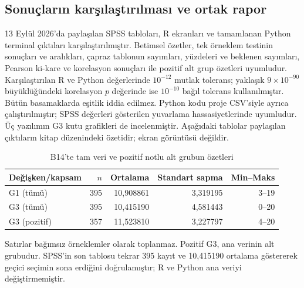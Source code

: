 \subsection{Sonuçların karşılaştırılması ve ortak rapor}
13 Eylül 2026'da paylaşılan SPSS tabloları, R ekranları ve tamamlanan
Python terminal çıktıları karşılaştırılmıştır. Betimsel özetler,
tek örneklem testinin sonuçları ve aralıkları, çapraz tablonun sayımları,
yüzdeleri ve beklenen sayımları, Pearson ki-kare ve korelasyon
sonuçları ile pozitif alt grup özetleri uyumludur. Karşılaştırılan
R ve Python değerlerinde $10^{-12}$ mutlak tolerans; yaklaşık
$9\times10^{-90}$ büyüklüğündeki korelasyon $p$ değerinde ise
$10^{-10}$ bağıl tolerans kullanılmıştır. Bütün basamaklarda
eşitlik iddia edilmez. Python kodu proje CSV'siyle ayrıca
çalıştırılmıştır; SPSS değerleri gösterilen yuvarlama hassasiyetlerinde
uyumludur. Üç yazılımın G3 kutu grafikleri de incelenmiştir.
Aşağıdaki tablolar paylaşılan çıktıların kitap düzenindeki özetidir;
ekran görüntüsü değildir.

\begin{table}[H]
\centering
\caption{B14'te tam veri ve pozitif notlu alt grubun özetleri}
\label{tab:b14-dogrulanmis-betimsel}
\begin{tabular}{@{}lrrrr@{}}
\toprule
Değişken/kapsam & $n$ & Ortalama & Standart sapma & Min--Maks \\
\midrule
G1 (tümü) & 395 & 10,908861 & 3,319195 & 3--19 \\
G3 (tümü) & 395 & 10,415190 & 4,581443 & 0--20 \\
G3 (pozitif) & 357 & 11,523810 & 3,227797 & 4--20 \\
\bottomrule
\end{tabular}
\par\smallskip
{\footnotesize Satırlar bağımsız örneklemler olarak toplanmaz.
Pozitif G3, ana verinin alt grubudur. SPSS'in son tablosu tekrar
395 kayıt ve 10,415190 ortalama göstererek geçici seçimin sona
erdiğini doğrulamıştır; R ve Python ana veriyi değiştirmemiştir.\par}
\end{table}

